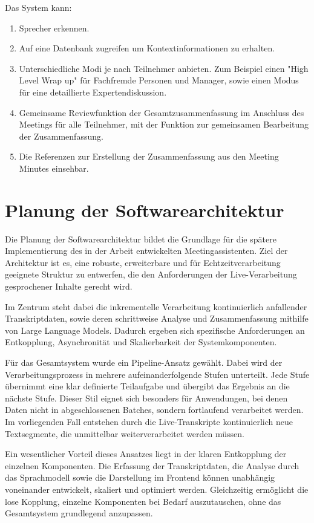 Das System kann: 
\begin{enumerate}
    \item Sprecher erkennen.
    \item Auf eine Datenbank zugreifen um Kontextinformationen zu erhalten. 
    \item Unterschiedliche Modi je nach Teilnehmer anbieten. Zum Beispiel einen "High Level Wrap up" für Fachfremde Personen und Manager, sowie einen Modus für eine detaillierte Expertendiskussion.
    \item Gemeinsame Reviewfunktion der Gesamtzusammenfassung im Anschluss des Meetings für alle Teilnehmer, mit der Funktion zur gemeinsamen Bearbeitung der Zusammenfassung.
    \item Die Referenzen zur Erstellung der Zusammenfassung aus den Meeting Minutes einsehbar.  
\end{enumerate}

\newpage
\section{Planung der Softwarearchitektur}
\label{sec:Planung_der_software}
Die Planung der Softwarearchitektur bildet die Grundlage für die spätere Implementierung des in der Arbeit entwickelten Meetingassistenten. Ziel der Architektur ist es, eine robuste, erweiterbare und für Echtzeitverarbeitung geeignete Struktur zu entwerfen, die den Anforderungen der Live-Verarbeitung gesprochener Inhalte gerecht wird. 

Im Zentrum steht dabei die inkrementelle Verarbeitung kontinuierlich anfallender Transkriptdaten, sowie deren schrittweise Analyse und Zusammenfassung mithilfe von Large Language Models. Dadurch ergeben sich spezifische Anforderungen an Entkopplung, Asynchronität und Skalierbarkeit der Systemkomponenten. 

Für das Gesamtsystem wurde ein Pipeline-Ansatz gewählt. Dabei wird der Verarbeitungsprozess in mehrere aufeinanderfolgende Stufen unterteilt. Jede Stufe übernimmt eine klar definierte Teilaufgabe und übergibt das Ergebnis an die nächste Stufe. Dieser Stil eignet sich besonders für Anwendungen, bei denen Daten nicht in abgeschlossenen Batches, sondern fortlaufend verarbeitet werden. Im vorliegenden Fall entstehen durch die Live-Transkripte kontinuierlich neue Textsegmente, die unmittelbar weiterverarbeitet werden müssen. 

Ein wesentlicher Vorteil dieses Ansatzes liegt in der klaren Entkopplung der einzelnen Komponenten. Die Erfassung der Transkriptdaten, die Analyse durch das Sprachmodell sowie die Darstellung im Frontend können unabhängig voneinander entwickelt, skaliert und optimiert werden. Gleichzeitig ermöglicht die lose Kopplung, einzelne Komponenten bei Bedarf auszutauschen, ohne das Gesamtsystem grundlegend anzupassen. 

